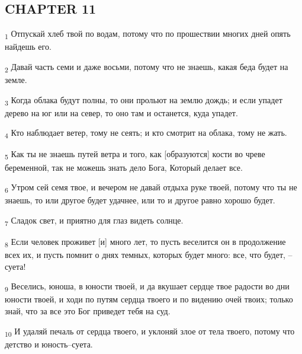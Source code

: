 \subsection{CHAPTER 11}
\begin{tcolorbox}
\textsubscript{1} Отпускай хлеб твой по водам, потому что по прошествии многих дней опять найдешь его.
\end{tcolorbox}
\begin{tcolorbox}
\textsubscript{2} Давай часть семи и даже восьми, потому что не знаешь, какая беда будет на земле.
\end{tcolorbox}
\begin{tcolorbox}
\textsubscript{3} Когда облака будут полны, то они прольют на землю дождь; и если упадет дерево на юг или на север, то оно там и останется, куда упадет.
\end{tcolorbox}
\begin{tcolorbox}
\textsubscript{4} Кто наблюдает ветер, тому не сеять; и кто смотрит на облака, тому не жать.
\end{tcolorbox}
\begin{tcolorbox}
\textsubscript{5} Как ты не знаешь путей ветра и того, как [образуются] кости во чреве беременной, так не можешь знать дело Бога, Который делает все.
\end{tcolorbox}
\begin{tcolorbox}
\textsubscript{6} Утром сей семя твое, и вечером не давай отдыха руке твоей, потому что ты не знаешь, то или другое будет удачнее, или то и другое равно хорошо будет.
\end{tcolorbox}
\begin{tcolorbox}
\textsubscript{7} Сладок свет, и приятно для глаз видеть солнце.
\end{tcolorbox}
\begin{tcolorbox}
\textsubscript{8} Если человек проживет [и] много лет, то пусть веселится он в продолжение всех их, и пусть помнит о днях темных, которых будет много: все, что будет, --суета!
\end{tcolorbox}
\begin{tcolorbox}
\textsubscript{9} Веселись, юноша, в юности твоей, и да вкушает сердце твое радости во дни юности твоей, и ходи по путям сердца твоего и по видению очей твоих; только знай, что за все это Бог приведет тебя на суд.
\end{tcolorbox}
\begin{tcolorbox}
\textsubscript{10} И удаляй печаль от сердца твоего, и уклоняй злое от тела твоего, потому что детство и юность--суета.
\end{tcolorbox}
